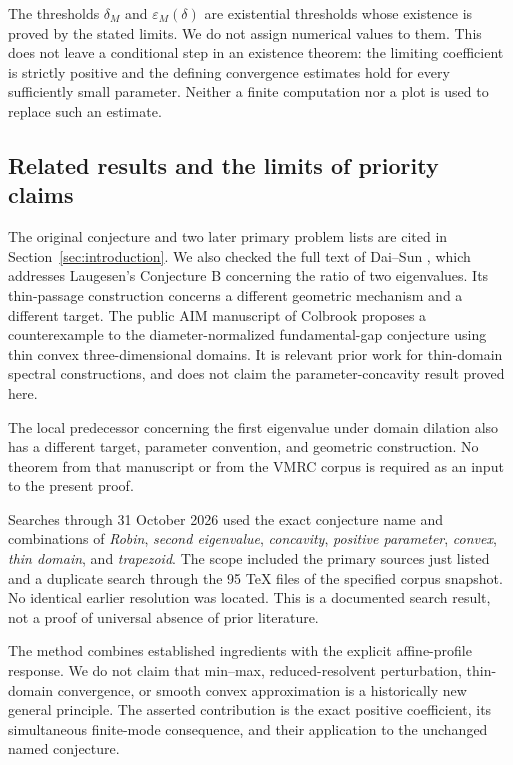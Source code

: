 \documentclass[11pt,a4paper]{article}
\theoremstyle{definition}\newtheorem{definition}[theorem]{Definition}
\theoremstyle{remark}\newtheorem{remark}[theorem]{Remark}
\begin{document}
The thresholds $\delta_M$ and $\varepsilon_M(\delta)$ are
existential thresholds whose existence is proved by the stated
limits. We do not assign numerical values to them. This does not
leave a conditional step in an existence theorem: the limiting
coefficient is strictly positive and the defining convergence
estimates hold for every sufficiently small parameter. Neither a
finite computation nor a plot is used to replace such an estimate.

\subsection{Related results and the limits of priority claims}
The original conjecture and two later primary problem lists are
cited in Section~\ref{sec:introduction}. We also checked the full
text of Dai--Sun \cite{DaiSun2026}, which addresses Laugesen's
Conjecture B concerning the ratio of two eigenvalues. Its
thin-passage construction concerns a different geometric
mechanism and a different target. The public AIM manuscript of
Colbrook \cite{Colbrook2026} proposes a counterexample to the
diameter-normalized fundamental-gap conjecture using thin convex
three-dimensional domains. It is relevant prior work for
thin-domain spectral constructions, and does not claim the
parameter-concavity result proved here.

The local predecessor concerning the first eigenvalue under
domain dilation \cite{KeioDilation2026} also has a different
target, parameter convention, and geometric construction.
No theorem from that manuscript or from the VMRC corpus is
required as an input to the present proof.

Searches through 31 October 2026 used the exact conjecture name
and combinations of \emph{Robin}, \emph{second eigenvalue},
\emph{concavity}, \emph{positive parameter}, \emph{convex},
\emph{thin domain}, and \emph{trapezoid}. The scope included the
primary sources just listed and a duplicate search through the
95 TeX files of the specified corpus snapshot. No identical
earlier resolution was located. This is a documented search
result, not a proof of universal absence of prior literature.

The method combines established ingredients with the explicit
affine-profile response. We do not claim that min--max,
reduced-resolvent perturbation, thin-domain convergence, or
smooth convex approximation is a historically new general
principle. The asserted contribution is the exact positive
coefficient, its simultaneous finite-mode consequence, and
their application to the unchanged named conjecture.
\end{document}
